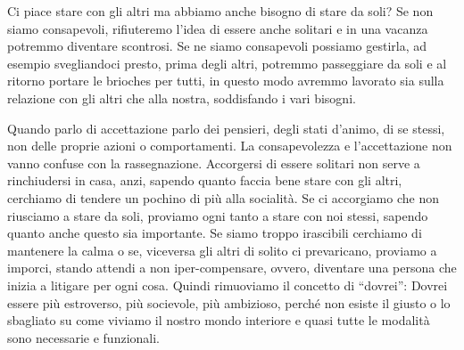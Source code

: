 \documentclass[12pt]{book} %
\begin{document}
Ci piace stare con gli altri ma abbiamo anche bisogno di stare da soli? Se non siamo consapevoli, rifiuteremo
l'idea di essere anche solitari e in una vacanza potremmo diventare scontrosi. Se ne siamo
consapevoli possiamo gestirla, ad esempio svegliandoci presto, prima degli altri, potremmo passeggiare da soli e al
ritorno portare le brioches per tutti, in questo modo avremmo lavorato sia sulla relazione con gli altri che alla
nostra, soddisfando i vari bisogni.

Quando parlo di accettazione parlo dei pensieri, degli stati d'animo, di se stessi, non delle
proprie azioni o comportamenti. La consapevolezza e l'accettazione non vanno confuse con la
rassegnazione. Accorgersi di essere solitari non serve a rinchiudersi in casa, anzi, sapendo quanto faccia bene stare
con gli altri, cerchiamo di tendere un pochino di più alla socialità. Se ci accorgiamo che non riusciamo a stare da
soli, proviamo ogni tanto a stare con noi stessi, sapendo quanto anche questo sia importante. Se siamo troppo irascibili cerchiamo di mantenere la calma o se, viceversa gli altri di solito ci prevaricano, proviamo a imporci, stando attendi a non iper-compensare, ovvero, diventare una persona che inizia a litigare per ogni cosa. Quindi rimuoviamo il concetto
di “dovrei”: Dovrei essere più estroverso, più socievole, più ambizioso, perché non esiste il giusto o lo sbagliato su
come viviamo il nostro mondo interiore e quasi tutte le modalità sono necessarie e funzionali.
\end{document}
